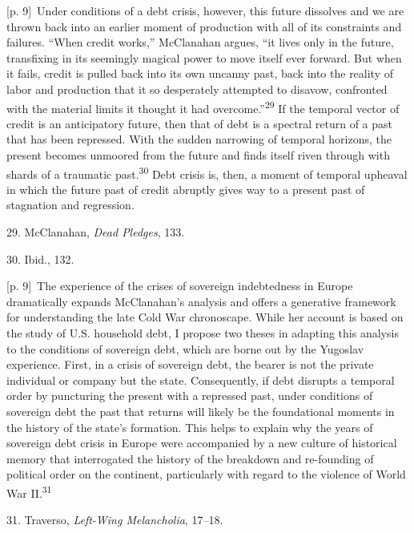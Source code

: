 \documentclass[10pt,a4paper]{article}
\begin{document}
{\scriptsize\color{gray} [p. 9]}\ Under conditions of a debt crisis, however, this future dissolves and we are thrown back into an earlier moment of production with all of its constraints and failures. “When credit works,” McClanahan argues, “it lives only in the future, transfixing in its seemingly magical power to move itself ever forward. But when it fails, credit is pulled back into its own uncanny past, back into the reality of labor and production that it so desperately attempted to disavow, confronted with the material limits it thought it had overcome.”\nobreak\textsuperscript{29} If the temporal vector of credit is an anticipatory future, then that of debt is a spectral return of a past that has been repressed. With the sudden narrowing of temporal horizons, the present becomes unmoored from the future and finds itself riven through with shards of a traumatic past.\nobreak\textsuperscript{30} Debt crisis is, then, a moment of temporal upheaval in which the future past of credit abruptly gives way to a present past of stagnation and regression.\par{\small 29. McClanahan, \textit{Dead Pledges}, 133.\par}{\small 30. Ibid., 132.\par}
{\scriptsize\color{gray} [p. 9]}\ The experience of the crises of sovereign indebtedness in Europe dramatically expands McClanahan’s analysis and offers a generative framework for understanding the late Cold War chronoscape. While her account is based on the study of U.S. household debt, I propose two theses in adapting this analysis to the conditions of sovereign debt, which are borne out by the Yugoslav experience. First, in a crisis of sovereign debt, the bearer is not the private individual or company but the state. Consequently, if debt disrupts a temporal order by puncturing the present with a repressed past, under conditions of sovereign debt the past that returns will likely be the foundational moments in the history of the state’s formation. This helps to explain why the years of sovereign debt crisis in Europe were accompanied by a new culture of historical memory that interrogated the history of the breakdown and re-founding of political order on the continent, particularly with regard to the violence of World War II.\nobreak\textsuperscript{31}\par{\small 31. Traverso, \textit{Left-Wing Melancholia}, 17–18.\par}
\end{document}
